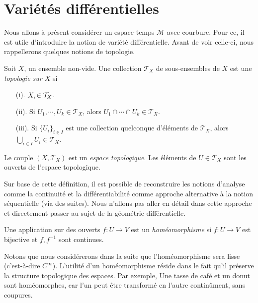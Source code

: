 \section{Variétés différentielles}
Nous allons à présent considérer un espace-temps $\mathcal{M}$ avec courbure. Pour ce, il est utile d'introduire la notion de variété différentielle. Avant de voir celle-ci, nous rappellerons quelques notions de topologie.
\begin{theoremframe}
    \begin{defi}
        Soit $X$, un ensemble non-vide. Une collection $\mathcal{T}_X$ de sous-ensembles de $X$ est une \textit{topologie sur $X$} si
        \begin{itemize}
            \item[(i).] $X,\empty \in \mathcal{T}_X$.
            \item[(ii).] Si $U_1,\cdots,U_k \in \mathcal{T}_X$, alors $U_1 \cap \cdots \cap U_k \in \mathcal{T}_X$.
            \item[(iii).] Si $\{ U_i\}_{i\in I}$ est une collection quelconque d'éléments de $\mathcal{T}_X$, alors $\bigcup_{i\in I} U_i \in \mathcal{T}_X$.
        \end{itemize}
        Le couple $(X,\mathcal{T}_X)$ est un \textit{espace topologique}. Les éléments de $U\in \mathcal{T}_X$ sont les ouverts de l'espace topologique.
    \end{defi}
\end{theoremframe}
Sur base de cette définition, il est possible de reconstruire les notions d'analyse comme la continuité et la différentiabilité comme approche alternative à la notion séquentielle (via des suites). Nous n'allons pas aller en détail dans cette approche et directement passer au sujet de la géométrie différentielle.
\begin{theoremframe}
    \begin{defi}
        Une application sur des ouverts $f:U\to V$ est un \emph{homéomorphisme} si $f:U\to V$ est bijective et $f,f^{-1}$ sont continues. 
    \end{defi}
\end{theoremframe}
Notons que nous considérerons dans la suite que l'homéomorphisme sera lisse (c'est-à-dire $C^\infty$). L'utilité d'un homéomorphisme réside dans le fait qu'il préserve la structure topologique des espaces. Par exemple, Une tasse de café et un donut sont homéomorphes, car l'un peut être transformé en l'autre continûment, sans coupures.
